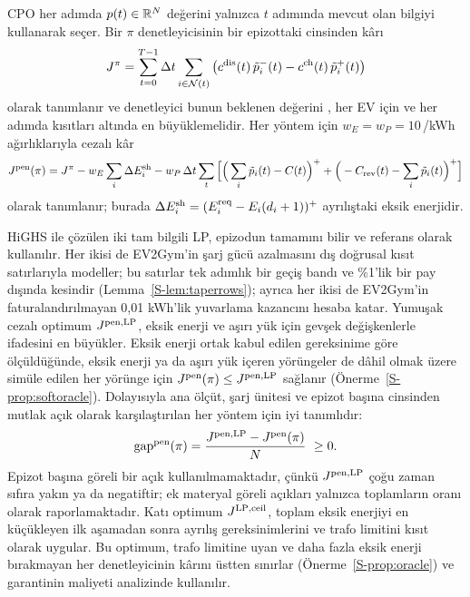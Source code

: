 CPO her adımda $p(t)\in\mathbb R^N$ değerini yalnızca $t$ adımında mevcut olan bilgiyi kullanarak seçer.
Bir $\pi$ denetleyicisinin bir epizottaki \texteuro{} cinsinden kârı
\begin{equation}\label{eq:objective}
J^{\pi}=\sum_{t=0}^{T-1}\Delta t\sum_{i\in\mathcal N(t)}\big(c^{\mathrm{dis}}(t)\,\tilde p_i^{-}(t)-c^{\mathrm{ch}}(t)\,\tilde p_i^{+}(t)\big)
\end{equation}
olarak tanımlanır ve denetleyici bunun beklenen değerini , her EV için  ve her adımda  kısıtları altında en büyüklemelidir.
Her yöntem için $w_E=w_P=10$\,\texteuro/kWh ağırlıklarıyla cezalı kâr
\begin{equation}\label{eq:jpen}
J^{\mathrm{pen}}(\pi)=J^{\pi}-w_E\sum_i\Delta E_i^{\mathrm{sh}}-w_P\,\Delta t\sum_t\Big[\Big(\sum_i\tilde p_i(t)-C(t)\Big)^{+}+\Big(-C_{\mathrm{rev}}(t)-\sum_i\tilde p_i(t)\Big)^{+}\Big]
\end{equation}
olarak tanımlanır; burada $\Delta E_i^{\mathrm{sh}}=(E^{\mathrm{req}}_i-E_i(d_i+1))^{+}$ ayrılıştaki eksik enerjidir.

HiGHS \cite{huangfu2018parallelizing} ile çözülen iki tam bilgili LP, epizodun tamamını bilir ve referans olarak kullanılır.
Her ikisi de EV2Gym'in şarj gücü azalmasını dış doğrusal kısıt satırlarıyla modeller; bu satırlar tek adımlık bir geçiş bandı ve \%1'lik bir pay dışında kesindir (Lemma~\ref{S-lem:taperrows}); ayrıca her ikisi de EV2Gym'in faturalandırılmayan 0,01 kWh'lik yuvarlama kazancını hesaba katar.
Yumuşak cezalı optimum $J^{\mathrm{pen,LP}}$, eksik enerji ve aşırı yük için gevşek değişkenlerle  ifadesini en büyükler.
Eksik enerji ortak kabul edilen gereksinime göre ölçüldüğünde, eksik enerji ya da aşırı yük içeren yörüngeler de dâhil olmak üzere simüle edilen her yörünge için $J^{\mathrm{pen}}(\pi)\le J^{\mathrm{pen,LP}}$ sağlanır (Önerme~\ref{S-prop:softoracle}).
Dolayısıyla ana ölçüt, şarj ünitesi ve epizot başına \texteuro{} cinsinden mutlak açık olarak karşılaştırılan her yöntem için iyi tanımlıdır:
\begin{equation}\label{eq:gap}
\mathrm{gap}^{\sm{pen}}(\pi)=\frac{J^{\sm{pen,LP}}-J^{\sm{pen}}(\pi)}{N}\ \ge0 .
\end{equation}
Epizot başına göreli bir açık kullanılmamaktadır, çünkü $J^{\mathrm{pen,LP}}$ çoğu zaman sıfıra yakın ya da negatiftir; ek materyal göreli açıkları yalnızca toplamların oranı olarak raporlamaktadır.
Katı optimum $J^{\mathrm{LP,ceil}}$, toplam eksik enerjiyi en küçükleyen ilk aşamadan sonra ayrılış gereksinimlerini ve trafo limitini kısıt olarak uygular.
Bu optimum, trafo limitine uyan ve daha fazla eksik enerji bırakmayan her denetleyicinin kârını üstten sınırlar (Önerme~\ref{S-prop:oracle}) ve garantinin maliyeti analizinde kullanılır.

